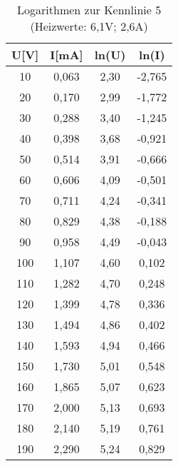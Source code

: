 \begin{table}[h]
	\begin{center}
		\begin{tabular}{cccc}
			U[V] & I[mA] & ln(U) & ln(I)\\ \hline
			10	&0,063& 2,30& -2,765\\                  
			20	&0,170& 2,99& -1,772\\
			30	&0,288& 3,40& -1,245\\
			40	&0,398& 3,68& -0,921\\
			50	&0,514& 3,91& -0,666\\
			60	&0,606& 4,09& -0,501\\
			70	&0,711& 4,24& -0,341\\
			80	&0,829& 4,38& -0,188\\
			90	&0,958& 4,49& -0,043\\
			100	&1,107& 4,60& 0,102\\
			110	&1,282& 4,70& 0,248\\
			120	&1,399& 4,78& 0,336\\
			130	&1,494& 4,86& 0,402\\
			140	&1,593& 4,94& 0,466\\
			150	&1,730& 5,01& 0,548\\
			160	&1,865& 5,07& 0,623\\
			170	&2,000& 5,13& 0,693\\
			180	&2,140& 5,19& 0,761\\
			190	&2,290& 5,24& 0,829\\
		\end{tabular}
		\caption{Logarithmen zur Kennlinie 5 (Heizwerte: 6,1V; 2,6A)}
		\label{tabblinreg}
	\end{center}
\end{table}